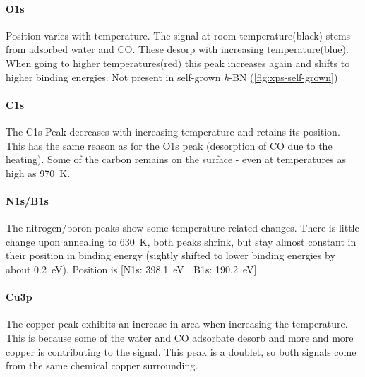 \paragraph{O1s}
Position varies with temperature. The signal at room temperature(black) stems from adsorbed water and CO. These desorp with increasing temperature(blue). When going to higher temperatures(red) this peak increases again and shifts to higher binding energies. Not present in self-grown \textit{h}-BN (\autoref{fig:xps-self-grown})

\paragraph{C1s}
The C1s Peak decreases with increasing temperature and retains its position. This has the same  reason as for the O1s peak (desorption of CO due to the heating). Some of the carbon remains on the surface - even at temperatures as high as \SI{970}{\K}.

\paragraph{N1s/B1s}
The nitrogen/boron peaks show some temperature related changes. There is little change upon annealing to \SI{630}{\K}, both peaks shrink, but stay almost constant in their position in binding energy (sightly shifted to lower binding energies by about \SI{0.2}{\eV}). Position is [N1s: \SI{398.1}{\eV} | B1s: \SI{190.2}{\eV}]

\paragraph{Cu3p}
The copper peak exhibits an increase in area when increasing the temperature. This is because some of the water and CO adsorbate desorb and more and more copper is contributing to the signal. This peak is a doublet, so both signals come from the same chemical copper surrounding.


